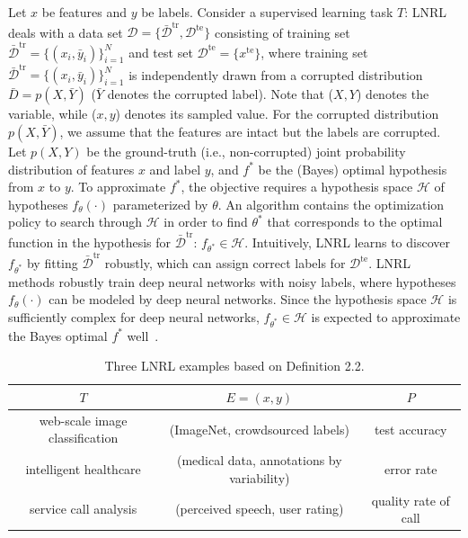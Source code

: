 \label{sec:notation}
Let $x$ be features and $y$ be labels. Consider a supervised learning task $T$: LNRL deals with a data set $\mathcal{D} = \{\bar{\mathcal{D}}^{\text{tr}},\mathcal{D}^{\text{te}}\}$ consisting of training set $\bar{\mathcal{D}}^{\text{tr}} = \{(x_i,\bar{y}_i)\}_{i=1}^N$ and test set $\mathcal{D}^{\text{te}} = \{x^{\text{te}}\}$, 
where training set $\bar{\mathcal{D}}^{\text{tr}}= \{(x_i,\bar{y}_i)\}_{i=1}^N$ is independently drawn from a corrupted distribution $\bar{D} = p(X,\bar{Y})$ ($\bar{Y}$ denotes the corrupted label).
Note that ($X,Y$) denotes the variable, while ($x,y$) denotes its sampled value.
For the corrupted distribution $p(X,\bar{Y})$, we assume that the features are intact but the labels are corrupted. Let $p(X, Y)$ be the ground-truth (i.e., non-corrupted) joint probability distribution of features $x$ and label $y$, 
and $f^*$ be the (Bayes) optimal hypothesis from $x$ to $y$. 
To approximate $f^*$, 
the objective requires a hypothesis space $\mathcal{H}$ of hypotheses 
$f_{\theta}(\cdot)$ parameterized by $\theta$. 
An algorithm contains the
optimization policy to search through $\mathcal{H}$ in order to find $\theta^*$ that corresponds to the optimal function in the hypothesis for $\bar{\mathcal{D}}^{\text{tr}}$: $f_{\theta^*} \in \mathcal{H}$.
Intuitively, LNRL learns to discover $f_{\theta^*}$ by fitting $\bar{\mathcal{D}}^{\text{tr}}$ robustly, which can assign correct labels for $\mathcal{D}^{\text{te}}$. LNRL methods robustly train deep neural networks with noisy labels, 
where hypotheses $f_{\theta}(\cdot)$ can be modeled by deep neural networks. Since the hypothesis space $\mathcal{H}$ is sufficiently complex for deep neural networks, $f_{\theta^*} \in \mathcal{H}$ is expected to approximate the Bayes optimal $f^*$ well~. 
\begin{table}[!tp]
\centering
\caption{Three LNRL examples based on Definition 2.2.}
\vspace{-10px}
\begin{tabular}{c|c|c}
	\hline
	$T$ & $E = (x,y)$ & $P$ \\\hline
	web-scale image classification  &  (ImageNet, crowdsourced labels) &  test accuracy \\\hline
	intelligent healthcare &  (medical data, annotations by variability) &  error rate \\\hline
	service call analysis &  (perceived speech, user rating) &  quality rate of call \\\hline
\end{tabular}
\label{tab:LNRL-exp}
\end{table}

